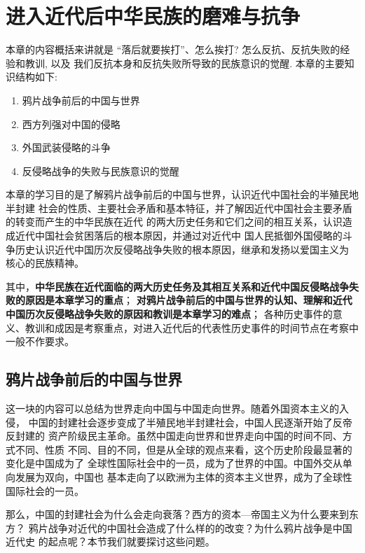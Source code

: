 \documentclass[10pt, UTF8]{ctexbook} %
\begin{document}
\newpage
\thispagestyle{empty}


\makeatletter
\let\ps@plain\ps@empty
\makeatother
\mainmatter

\chapter{进入近代后中华民族的磨难与抗争}
\thispagestyle{empty}

\quad\quad 本章的内容概括来讲就是 “落后就要挨打”、怎么挨打? 怎么反抗、反抗失败的经验和教训, 以及
我们反抗本身和反抗失败所导致的民族意识的觉醒. 本章的主要知识结构如下:
\begin{enumerate}[label=1.\arabic*, itemsep=0pt]
    \item 鸦片战争前后的中国与世界
    \item 西方列强对中国的侵略
    \item 外国武装侵略的斗争
    \item 反侵略战争的失败与民族意识的觉醒
\end{enumerate}
本章的学习目的是了解鸦片战争前后的中国与世界，认识近代中国社会的半殖民地半封建
社会的性质、主要社会矛盾和基本特征，并了解因近代中国社会主要矛盾的转变而产生的中华民族在近代
的两大历史任务和它们之间的相互关系，认识造成近代中国社会贫困落后的根本原因，并通过对近代中
国人民抵御外国侵略的斗争历史认识近代中国历次反侵略战争失败的根本原因，继承和发扬以爱国主义为
核心的民族精神。

其中，\textbf{中华民族在近代面临的两大历史任务及其相互关系和近代中国反侵略战争失败的原因是本章学习的重点}；
\textbf{对鸦片战争前后的中国与世界的认知、理解和近代中国历次反侵略战争失败的原因和教训是本章学习的难点}；
各种历史事件的意义、教训和成因是考察重点，对进入近代后的代表性历史事件的时间节点在考察中一般不作要求。

\section{鸦片战争前后的中国与世界}

这一块的内容可以总结为世界走向中国与中国走向世界。随着外国资本主义的入侵，
中国的封建社会逐步变成了半殖民地半封建社会，中国人民逐渐开始了反帝反封建的
资产阶级民主革命。虽然中国走向世界和世界走向中国的时间不同、方式不同、性质
不同、目的不同，但是从全球的观点来看，这个历史阶段最显著的变化是中国成为了
全球性国际社会中的一员，成为了世界的中国。中国外交从单向发展为双向，中国也
基本走向了以欧洲为主体的资本主义世界，成为了全球性国际社会的一员。

那么，中国的封建社会为什么会走向衰落？西方的资本—帝国主义为什么要来到东方？
鸦片战争对近代的中国社会造成了什么样的的改变？为什么鸦片战争是中国近代史
的起点呢？本节我们就要探讨这些问题。
\end{document}
